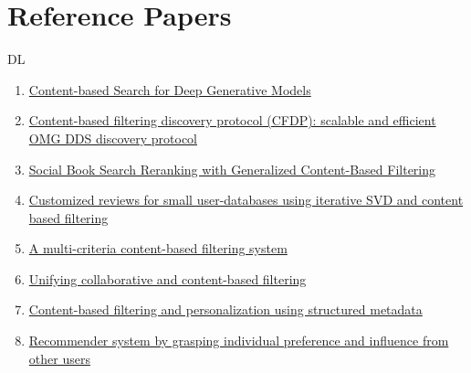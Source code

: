 \section*{Reference Papers}\label{sec:reference_papers}


DL
\begin{enumerate}[noitemsep, topsep=1px]
    \item \href{https://dl.acm.org/doi/10.1145/3610548.3618189}{Content-based Search for Deep Generative Models} 
    \item \href{https://dl.acm.org/doi/10.1145/2611286.2611300}{Content-based filtering discovery protocol (CFDP): scalable and efficient OMG DDS discovery protocol}
    \item \href{https://dl.acm.org/doi/10.1145/2661829.2661940}{Social Book Search Reranking with Generalized Content-Based Filtering}
    \item \href{https://dl.acm.org/doi/10.1145/2501025.2501036}{Customized reviews for small user-databases using iterative SVD and content based filtering}
    \item \href{https://dl.acm.org/doi/10.1145/1277741.1277903}{A multi-criteria content-based filtering system}
    \item \href{https://dl.acm.org/doi/10.1145/1015330.1015394}{Unifying collaborative and content-based filtering}
    \item \href{https://dl.acm.org/doi/10.1145/544220.544341}{Content-based filtering and personalization using structured metadata}
    \item \href{https://dl.acm.org/doi/10.1145/2492517.2500283}{Recommender system by grasping individual preference and influence from other users}
\end{enumerate}

